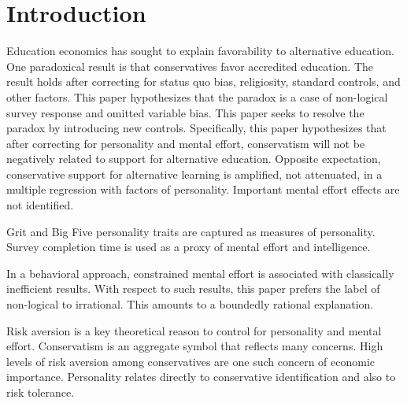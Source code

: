 \documentclass[review]{elsarticle}
\begin{document}
\pagebreak
\linenumbers

\section{Introduction}

Education economics has sought to explain favorability to alternative education.
One paradoxical result is that conservatives favor accredited education\cite{vandivier2020preliminary}.
The result holds after correcting for status quo bias, religiosity, standard controls, and other factors.
This paper hypothesizes that the paradox is a case of non-logical survey response and omitted variable bias.
This paper seeks to resolve the paradox by introducing new controls.
Specifically, this paper hypothesizes that after correcting for personality and mental effort,
conservatism will not be negatively related to support for alternative education.
Opposite expectation,
conservative support for alternative learning is amplified,
not attenuated,
in a multiple regression with factors of personality.
Important mental effort effects are not identified.

Grit and Big Five personality traits are captured as measures of personality.
Survey completion time is used as a proxy of mental effort and intelligence.

In a behavioral approach, constrained mental effort is associated with classically inefficient results.
With respect to such results, this paper prefers the label of non-logical to irrational.
This amounts to a boundedly rational explanation\cite{candela2016vilfredo}.

Risk aversion is a key theoretical reason to control for personality and mental effort.
Conservatism is an aggregate symbol that reflects many concerns\cite{hill1997liberal}.
High levels of risk aversion among conservatives are one such concern of economic importance\cite{perhac1996does}.
Personality relates directly to conservative identification\cite{chirumbolo2010personality} and also to risk tolerance.
\end{document}
